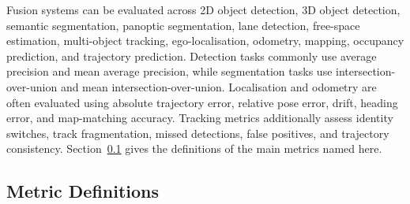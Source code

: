 Fusion systems can be evaluated across 2D object detection, 3D object detection, semantic segmentation, panoptic segmentation, lane detection, free-space estimation, multi-object tracking, ego-localisation, odometry, mapping, occupancy prediction, and trajectory prediction. Detection tasks commonly use average precision and mean average precision, while segmentation tasks use intersection-over-union and mean intersection-over-union. Localisation and odometry are often evaluated using absolute trajectory error, relative pose error, drift, heading error, and map-matching accuracy. Tracking metrics additionally assess identity switches, track fragmentation, missed detections, false positives, and trajectory consistency. Section~\ref{subsec:metrics} gives the definitions of the main metrics named here.

\subsection{Metric Definitions}
\label{subsec:metrics}

